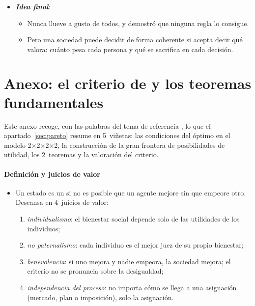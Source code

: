\documentclass[11pt]{article}
\begin{document}
\begin{itemize}
\begin{itemize}
  \item Elegir qué axioma sacrificar es ya un juicio de valor, y es mejor hacerlo a la vista, como en las constituciones, que esconderlo en una regla supuestamente técnica.
  \end{itemize}
\item \textbf{\emph{Idea final}}:
  \begin{itemize}
  \item Nunca llueve a gusto de todos, y  demostró que ninguna regla lo consigue.

  \item Pero una sociedad puede decidir de forma coherente si acepta decir qué valora: cuánto pesa cada persona y qué se sacrifica en cada decisión.
  \end{itemize}
\end{itemize}

\clearpage
\appendix

\section{Anexo: el criterio de  y los teoremas fundamentales}\label{anexo:pareto}

Este anexo recoge, con las palabras del tema de referencia , lo que el apartado~\ref{sec:pareto} resume en 5~viñetas: las condiciones del óptimo en el modelo 2×2×2×2, la construcción de la gran frontera de posibilidades de utilidad, los 2~teoremas y la valoración del criterio.

\paragraph{Definición y juicios de valor}

\begin{itemize}
\item Un estado es un  si no es posible que un agente mejore sin que empeore otro. Descansa en 4~juicios de valor\nocite{GravelleRees2004Microeconomics}:
  \begin{enumerate}
  \item \emph{individualismo}: el bienestar social depende solo de las utilidades de los individuos;
  \item \emph{no paternalismo}: cada individuo es el mejor juez de su propio bienestar;
  \item \emph{benevolencia}: si uno mejora y nadie empeora, la sociedad mejora; el criterio no se pronuncia sobre la desigualdad;
  \item \emph{independencia del proceso}: no importa cómo se llega a una asignación (mercado, plan o imposición), solo la asignación.
  \end{enumerate}
\end{itemize}
\end{document}
